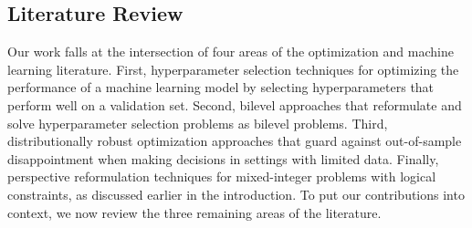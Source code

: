 \documentclass[mnsc,nonblindrev]{informs3} %
\begin{document}
\subsection{Literature Review}
Our work falls at the intersection of four areas of the optimization and machine learning literature. %
First, hyperparameter selection techniques for optimizing the performance of a machine learning model by selecting hyperparameters that perform well on a validation set. %
Second, bilevel approaches that reformulate and solve hyperparameter selection problems as bilevel problems. Third, distributionally robust optimization approaches that guard against out-of-sample disappointment when making decisions in settings with limited data. Finally, perspective reformulation techniques for mixed-integer problems with logical constraints{\color{black}, as discussed earlier in the introduction.} To put our contributions into context, we now review {\color{black}the three remaining} areas of the literature.
\end{document}
